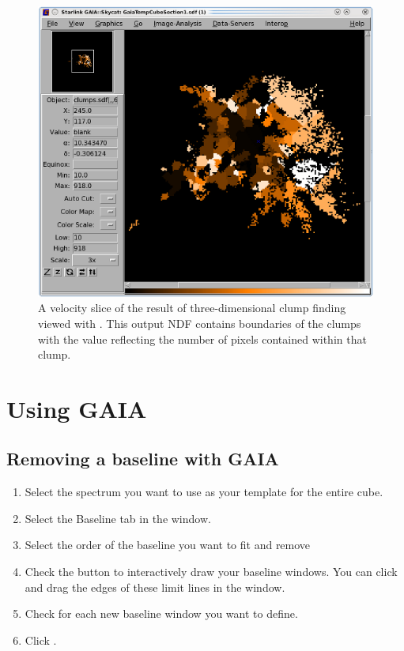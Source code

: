 \documentclass[11pt,oneside,chapters]{starlink}
\begin{document}
\vspace{0.7cm}
\begin{figure}[h!]
\begin{center}
\includegraphics[width=0.7\linewidth]{sc20_clumps}
\caption[A velocity slice of the result of three-dimensional clump finding
viewed with \gaia.]{\label{fig:clumps2}
  A velocity slice of the result of three-dimensional clump finding viewed
  with \gaia. This output NDF contains boundaries of the clumps with the
  value reflecting the number of pixels contained within that clump.}
\end{center}
\end{figure}


\clearpage
\chapter{Using GAIA}
\label{sec:gaia}

\section{Removing a baseline with GAIA}
\label{sec:gaiabaseline}

\begin{enumerate}[label=(\textbf{\arabic*})]
\item Select the spectrum you want to use as your template for the entire cube.

\item Select the Baseline tab in the  window.

\item Select the order of the baseline you want to fit and remove

\item Check the  button to
interactively draw your baseline windows. You can click and drag the
edges of these limit lines in the  window.

\item Check  for each new baseline window you want to define.

\item Click .
\end{enumerate}
\end{document}
